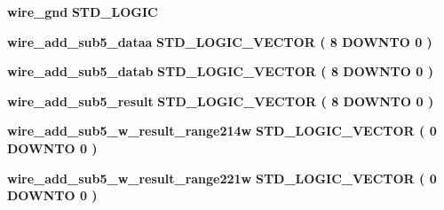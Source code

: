 \begin{DoxyCompactItemize}
\item 
{\bf wire\+\_\+gnd} {\bfseries \textcolor{comment}{S\+T\+D\+\_\+\+L\+O\+G\+IC}\textcolor{vhdlchar}{ }} 
\item 
{\bf wire\+\_\+add\+\_\+sub5\+\_\+dataa} {\bfseries \textcolor{comment}{S\+T\+D\+\_\+\+L\+O\+G\+I\+C\+\_\+\+V\+E\+C\+T\+OR}\textcolor{vhdlchar}{ }\textcolor{vhdlchar}{(}\textcolor{vhdlchar}{ }\textcolor{vhdlchar}{ } \textcolor{vhdldigit}{8} \textcolor{vhdlchar}{ }\textcolor{keywordflow}{D\+O\+W\+N\+TO}\textcolor{vhdlchar}{ }\textcolor{vhdlchar}{ } \textcolor{vhdldigit}{0} \textcolor{vhdlchar}{ }\textcolor{vhdlchar}{)}\textcolor{vhdlchar}{ }} 
\item 
{\bf wire\+\_\+add\+\_\+sub5\+\_\+datab} {\bfseries \textcolor{comment}{S\+T\+D\+\_\+\+L\+O\+G\+I\+C\+\_\+\+V\+E\+C\+T\+OR}\textcolor{vhdlchar}{ }\textcolor{vhdlchar}{(}\textcolor{vhdlchar}{ }\textcolor{vhdlchar}{ } \textcolor{vhdldigit}{8} \textcolor{vhdlchar}{ }\textcolor{keywordflow}{D\+O\+W\+N\+TO}\textcolor{vhdlchar}{ }\textcolor{vhdlchar}{ } \textcolor{vhdldigit}{0} \textcolor{vhdlchar}{ }\textcolor{vhdlchar}{)}\textcolor{vhdlchar}{ }} 
\item 
{\bf wire\+\_\+add\+\_\+sub5\+\_\+result} {\bfseries \textcolor{comment}{S\+T\+D\+\_\+\+L\+O\+G\+I\+C\+\_\+\+V\+E\+C\+T\+OR}\textcolor{vhdlchar}{ }\textcolor{vhdlchar}{(}\textcolor{vhdlchar}{ }\textcolor{vhdlchar}{ } \textcolor{vhdldigit}{8} \textcolor{vhdlchar}{ }\textcolor{keywordflow}{D\+O\+W\+N\+TO}\textcolor{vhdlchar}{ }\textcolor{vhdlchar}{ } \textcolor{vhdldigit}{0} \textcolor{vhdlchar}{ }\textcolor{vhdlchar}{)}\textcolor{vhdlchar}{ }} 
\item 
{\bf wire\+\_\+add\+\_\+sub5\+\_\+w\+\_\+result\+\_\+range214w} {\bfseries \textcolor{comment}{S\+T\+D\+\_\+\+L\+O\+G\+I\+C\+\_\+\+V\+E\+C\+T\+OR}\textcolor{vhdlchar}{ }\textcolor{vhdlchar}{(}\textcolor{vhdlchar}{ }\textcolor{vhdlchar}{ } \textcolor{vhdldigit}{0} \textcolor{vhdlchar}{ }\textcolor{keywordflow}{D\+O\+W\+N\+TO}\textcolor{vhdlchar}{ }\textcolor{vhdlchar}{ } \textcolor{vhdldigit}{0} \textcolor{vhdlchar}{ }\textcolor{vhdlchar}{)}\textcolor{vhdlchar}{ }} 
\item 
{\bf wire\+\_\+add\+\_\+sub5\+\_\+w\+\_\+result\+\_\+range221w} {\bfseries \textcolor{comment}{S\+T\+D\+\_\+\+L\+O\+G\+I\+C\+\_\+\+V\+E\+C\+T\+OR}\textcolor{vhdlchar}{ }\textcolor{vhdlchar}{(}\textcolor{vhdlchar}{ }\textcolor{vhdlchar}{ } \textcolor{vhdldigit}{0} \textcolor{vhdlchar}{ }\textcolor{keywordflow}{D\+O\+W\+N\+TO}\textcolor{vhdlchar}{ }\textcolor{vhdlchar}{ } \textcolor{vhdldigit}{0} \textcolor{vhdlchar}{ }\textcolor{vhdlchar}{)}\textcolor{vhdlchar}{ }} 

\end{DoxyCompactItemize}
